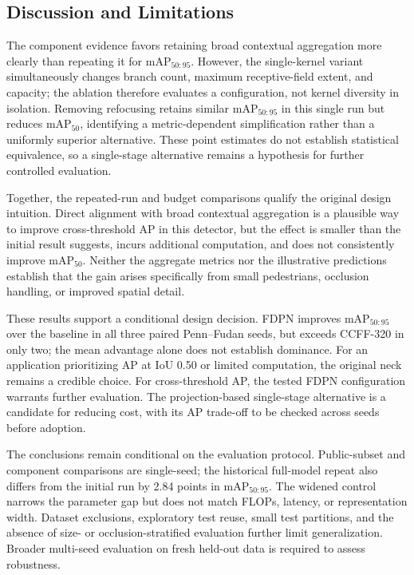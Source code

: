 \documentclass[journal]{IEEEtran}
\newcommand{\mapfifty}{mAP$_{50}$}
\newcommand{\mapcoco}{mAP$_{50:95}$}
\begin{document}



\subsection{Discussion and Limitations}
The component evidence favors retaining broad contextual aggregation more clearly than repeating it for \mapcoco{}. However, the single-kernel variant simultaneously changes branch count, maximum receptive-field extent, and capacity; the ablation therefore evaluates a configuration, not kernel diversity in isolation. Removing refocusing retains similar \mapcoco{} in this single run but reduces \mapfifty{}, identifying a metric-dependent simplification rather than a uniformly superior alternative. These point estimates do not establish statistical equivalence, so a single-stage alternative remains a hypothesis for further controlled evaluation.

Together, the repeated-run and budget comparisons qualify the original design intuition. Direct alignment with broad contextual aggregation is a plausible way to improve cross-threshold AP in this detector, but the effect is smaller than the initial result suggests, incurs additional computation, and does not consistently improve \mapfifty{}. Neither the aggregate metrics nor the illustrative predictions establish that the gain arises specifically from small pedestrians, occlusion handling, or improved spatial detail.

These results support a conditional design decision. FDPN improves \mapcoco{} over the baseline in all three paired Penn--Fudan seeds, but exceeds CCFF-320 in only two; the mean advantage alone does not establish dominance. For an application prioritizing AP at IoU 0.50 or limited computation, the original neck remains a credible choice. For cross-threshold AP, the tested FDPN configuration warrants further evaluation. The projection-based single-stage alternative is a candidate for reducing cost, with its AP trade-off to be checked across seeds before adoption.

The conclusions remain conditional on the evaluation protocol. Public-subset and component comparisons are single-seed; the historical full-model repeat also differs from the initial run by 2.84 points in \mapcoco{}. The widened control narrows the parameter gap but does not match FLOPs, latency, or representation width. Dataset exclusions, exploratory test reuse, small test partitions, and the absence of size- or occlusion-stratified evaluation further limit generalization. Broader multi-seed evaluation on fresh held-out data is required to assess robustness.
\end{document}
